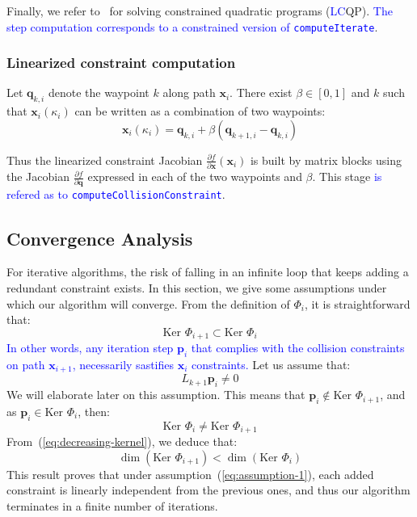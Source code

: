 \documentclass{tADR2e}
\newcommand\p{\mathbf{p}}
\newcommand\conf{\mathbf{q}}
\newcommand\xx{\mathbf{x}} %
\newcommand\tcolli{\kappa_i}
\newcommand\Jf{\Phi}
\newcommand\kernel{\mbox{Ker }}
\begin{document}
\vspace{0.4cm}

Finally, we refer to~\cite{nocedal2006numerical} for solving constrained quadratic 
programs (\textcolor{blue}{LC}QP). \textcolor{blue}{The step computation corresponds to a constrained 
version of \texttt{computeIterate}}.


\vspace{0.2cm}

\subsubsection{Linearized constraint computation} \label{sec:lin_constr_compt}

Let $\conf_{k,i}$ denote the waypoint $k$ along path $\xx_i$.
There exist $\beta\in[0,1]$ and $k$ such that $\xx_i (\tcolli)$ can be written as a combination of two waypoints:
$$
\xx_i (\tcolli) = \conf_{k,i} + \beta (\conf_{k+1,i} - \conf_{k,i})
$$

Thus the linearized constraint Jacobian $\frac{\partial f}{\partial \xx}(\xx_i)$ 
is built by matrix 
blocks using the Jacobian $\frac{\partial f}{\partial \conf}$ expressed in 
each of the two waypoints and $\beta$. This stage \textcolor{blue}{is refered as 
to \texttt{computeCollisionConstraint}}.


\subsection{Convergence Analysis}
For iterative algorithms, the risk of falling in an infinite loop 
that keeps adding a redundant constraint exists.
In this section, we give some assumptions under which our 
algorithm will converge.
From the definition of $\Jf_{i}$, it is straightforward that:
\begin{equation}\label{eq:decreasing-kernel}
\kernel \Jf_{i+1} \subset \kernel \Jf_{i}
\end{equation}
\textcolor{blue}{In other words, any iteration step $\p_i$ that complies with the 
collision constraints on path $\xx_{i+1}$, necessarily sastifies $\xx_i$ constraints.}
Let us assume that:
\begin{equation}\label{eq:assumption-1}
L_{k+1}\p_i \not= 0
\end{equation}
We will elaborate later on this assumption. This means that 
$\p_{i}\notin\kernel \Jf_{i+1}$, and as $\p_{i}\in\kernel \Jf_{i}$, then:
$$
\kernel \Jf_i \not= \kernel \Jf_{i+1}
$$
From~(\ref{eq:decreasing-kernel}), we deduce that:
$$
\dim (\kernel \Jf_{i+1}) < \dim (\kernel \Jf_i)
$$
This result proves that under assumption~(\ref{eq:assumption-1}), each added constraint 
is linearly independent from the 
previous ones, and thus our algorithm terminates in a finite number of iterations.
\end{document}

